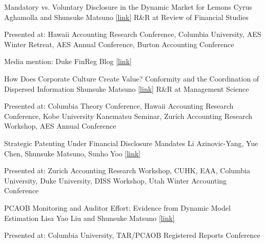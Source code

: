 \paperentry
	{Mandatory vs. Voluntary Disclosure in the Dynamic Market for Lemons}   %
	{Cyrus Aghamolla and Shunsuke Matsuno}   %
	{}   %
	{\href{https://papers.ssrn.com/sol3/papers.cfm?abstract_id=4680389}{[link]}}  %
	{}   %
	{R\&R at Review of Financial Studies}   %
	{
	\begin{cvitems}  %
		\item {Presented at: Hawaii Accounting Research Conference, Columbia University, AES Winter Retreat, AES Annual Conference, Burton Accounting Conference} 
		\item {Media mention: Duke FinReg Blog \href{https://sites.duke.edu/thefinregblog/2024/10/29/mandatory-vs-voluntary-disclosure-in-the-dynamic-market-for-lemons/}{[link]}}
	\end{cvitems}
	}
	{}

\paperentry
	{How Does Corporate Culture Create Value? Conformity and the Coordination of Dispersed Information}
	{Shunsuke Matsuno}
	{}   %
	{\href{https://papers.ssrn.com/sol3/papers.cfm?abstract_id=5291646}{[link]}}
	{}
	{R\&R at Management Science}
	{
	\begin{cvitems} %
		\item {Presented at: Columbia Theory Conference, Hawaii Accounting Research Conference, Kobe University Kanematsu Seminar, Zurich Accounting Research Workshop, AES Annual Conference}
	\end{cvitems}
	}
	{}

\paperentry
	{Strategic Patenting Under Financial Disclosure Mandates}
	{Li Azinovic-Yang, Yue Chen, Shunsuke Matsuno, Sunho Yoo}
	{}   %
	{\href{https://papers.ssrn.com/sol3/papers.cfm?abstract_id=5767542}{[link]}}
	{}
	{}
	{
	\begin{cvitems} %
		\item {Presented at: Zurich Accounting Research Workshop, CUHK, EAA, Columbia University, Duke University, DISS Workshop, Utah Winter Accounting Conference}
	\end{cvitems}
	}
	{}

	\paperentry
	{PCAOB Monitoring and Auditor Effort: Evidence from Dynamic Model Estimation}
	{Lisa Yao Liu and Shunsuke Matsuno}
	{}   %
	{\href{https://papers.ssrn.com/sol3/papers.cfm?abstract_id=6760918}{[link]}}
	{}
	{}
	{
	\begin{cvitems} %
		\item {Presented at: Columbia University, TAR/PCAOB Registered Reports Conference}
	\end{cvitems}
	}
	{}

